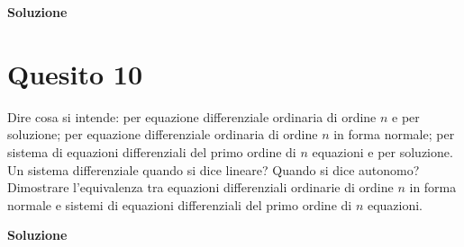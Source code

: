 \medskip
\begin{large}
\textbf{Soluzione}
\end{large}


\section*{Quesito 10}
Dire cosa si intende: per equazione differenziale ordinaria di ordine $n$ e per
soluzione; per equazione differenziale ordinaria di ordine $n$ in forma normale; per sistema
di equazioni differenziali del primo ordine di $n$ equazioni e per soluzione. Un sistema
differenziale quando si dice lineare? Quando si dice autonomo? Dimostrare l’equivalenza
tra equazioni differenziali ordinarie di ordine $n$ in forma normale e sistemi di equazioni
differenziali del primo ordine di $n$ equazioni.


\medskip
\begin{large}
\textbf{Soluzione}
\end{large}
